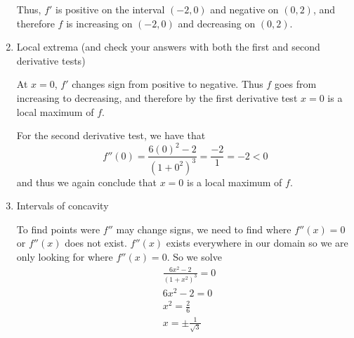 \documentclass[nooutcomes]{ximera}
\begin{document}
\begin{problem}
\begin{enumerate}
\begin{freeResponse}
		
\begin{center}
\begin{image}
\end{image}
\end{center}


		Thus, $f'$ is positive on the interval $(-2,0)$ and negative on $(0,2)$, and therefore $f$ is increasing on $(-2,0)$ and decreasing on $(0,2)$.  
		\end{freeResponse}
	\item  Local extrema (and check your answers with both the first and second derivative tests)
	
		\begin{freeResponse}
		At $x=0$, $f'$ changes sign from positive to negative.  Thus $f$ goes from increasing to decreasing, and therefore by the first derivative test $x=0$ is a local maximum of $f$.  
		
		For the second derivative test, we have that
		$$ f''(0) = \frac{6(0)^2 - 2}{(1+0^2)^3} = \frac{-2}{1} = -2 < 0 $$
		and thus we again conclude that $x=0$ is a local maximum of $f$.
		\end{freeResponse}
	\item  Intervals of concavity
	
		\begin{freeResponse}
		To find points were $f''$ may change signs, we need to find where $f''(x)=0$ or $f''(x)$ does not exist.  $f''(x)$ exists everywhere in our domain so we are only looking for where $f''(x)=0$.  So we solve
		\begin{align*}
  		& \frac{6{{x}^{2}}-2}{{{(1+{{x}^{2}})}^{3}}}=0 \\ 
 		& 6{{x}^{2}}-2=0 \\ 
 		& {{x}^{2}}=\frac{2}{6} \\ 
 		& x=\pm \frac{1}{\sqrt{3}} \\ 
		\end{align*}
		

\end{freeResponse}
\end{enumerate}
\end{problem}
\end{document}
